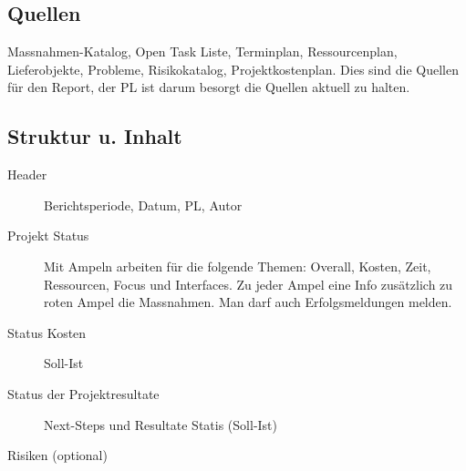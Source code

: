 \subsection{Quellen}
Massnahmen-Katalog, Open Task Liste, Terminplan, Ressourcenplan, Lieferobjekte, Probleme, Risikokatalog, Projektkostenplan. Dies sind die Quellen für den Report, der PL ist darum besorgt die Quellen aktuell zu halten.

\subsection{Struktur u. Inhalt}
\begin{description}
	\item [Header] Berichtsperiode, Datum, PL, Autor
	\item [Projekt Status] Mit Ampeln arbeiten für die folgende Themen: Overall, Kosten, Zeit, Ressourcen, Focus und Interfaces. Zu jeder Ampel eine Info zusätzlich zu roten Ampel die Massnahmen. Man darf auch Erfolgsmeldungen melden.
	\item [Status Kosten] Soll-Ist
	\item [Status der Projektresultate] Next-Steps und Resultate Statis (Soll-Ist)
	\item [Risiken (optional)]
\end{description}
